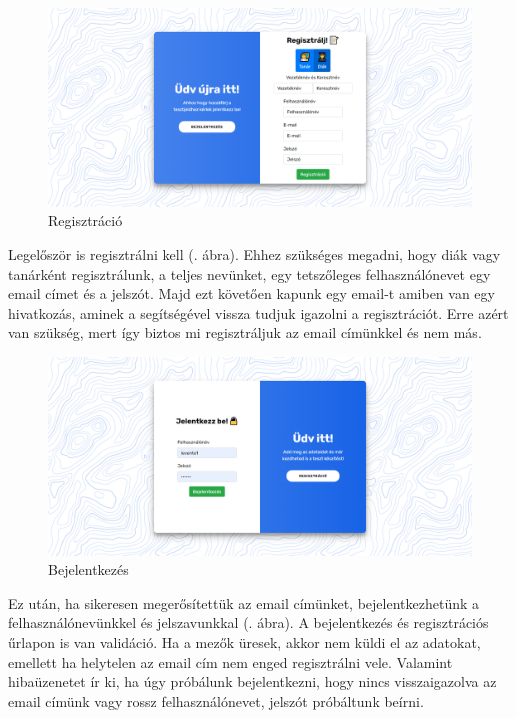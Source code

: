 \begin{figure}[h!]
    \centering
    \includegraphics[width=\linewidth]{images/signin.png}
    \caption{Regisztráció}
    \label{fig:signin}
\end{figure}

Legelőször is regisztrálni kell (. ábra). Ehhez szükséges megadni, hogy diák vagy tanárként regisztrálunk, a teljes nevünket, egy tetszőleges felhasználónevet egy email címet és a jelszót. Majd ezt követően kapunk egy email-t amiben van egy hivatkozás, aminek a segítségével vissza tudjuk igazolni a regisztrációt. Erre azért van szükség, mert így biztos mi regisztráljuk az email címünkkel és nem más.

\begin{figure}[H]
    \centering
    \includegraphics[width=\linewidth]{images/login.png}
    \caption{Bejelentkezés}
    \label{fig:login}
\end{figure}

Ez után, ha sikeresen megerősítettük az email címünket, bejelentkezhetünk a felhasználónevünkkel és jelszavunkkal (. ábra).
A bejelentkezés és regisztrációs űrlapon is van validáció. Ha a mezők üresek, akkor nem küldi el az adatokat, emellett ha helytelen az email cím nem enged regisztrálni vele. Valamint hibaüzenetet ír ki, ha úgy próbálunk bejelentkezni, hogy nincs visszaigazolva az email címünk vagy rossz felhasználónevet, jelszót próbáltunk beírni.

